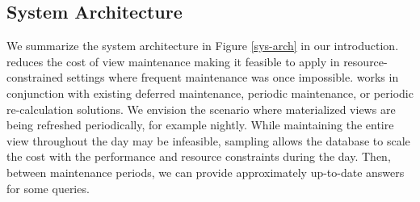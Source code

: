 \subsection{System Architecture}
We summarize the system architecture in Figure \ref{sys-arch} in our introduction.
\svc reduces the cost of view maintenance making it feasible to apply in resource-constrained settings where frequent maintenance was once impossible.
\svc works in conjunction with existing deferred maintenance, periodic maintenance, or periodic re-calculation solutions.
We envision the scenario where materialized views are being refreshed periodically, for example nightly.
While maintaining the entire view throughout the day may be infeasible, sampling allows the database to scale the cost with the performance and resource constraints during the day.
Then, between maintenance periods, we can provide approximately up-to-date answers for some queries.

